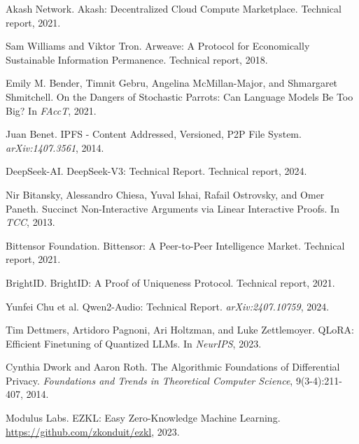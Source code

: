 \documentclass[11pt,a4paper]{article}
\begin{document}

\begin{thebibliography}{99}

Akash Network.
\newblock Akash: Decentralized Cloud Compute Marketplace.
\newblock Technical report, 2021.

Sam Williams and Viktor Tron.
\newblock Arweave: A Protocol for Economically Sustainable Information Permanence.
\newblock Technical report, 2018.

Emily M. Bender, Timnit Gebru, Angelina McMillan-Major, and Shmargaret Shmitchell.
\newblock On the Dangers of Stochastic Parrots: Can Language Models Be Too Big?
\newblock In \textit{FAccT}, 2021.

Juan Benet.
\newblock IPFS - Content Addressed, Versioned, P2P File System.
\newblock \textit{arXiv:1407.3561}, 2014.

DeepSeek-AI.
\newblock DeepSeek-V3: Technical Report.
\newblock Technical report, 2024.

Nir Bitansky, Alessandro Chiesa, Yuval Ishai, Rafail Ostrovsky, and Omer Paneth.
\newblock Succinct Non-Interactive Arguments via Linear Interactive Proofs.
\newblock In \textit{TCC}, 2013.

Bittensor Foundation.
\newblock Bittensor: A Peer-to-Peer Intelligence Market.
\newblock Technical report, 2021.

BrightID.
\newblock BrightID: A Proof of Uniqueness Protocol.
\newblock Technical report, 2021.

Yunfei Chu et al.
\newblock Qwen2-Audio: Technical Report.
\newblock \textit{arXiv:2407.10759}, 2024.

Tim Dettmers, Artidoro Pagnoni, Ari Holtzman, and Luke Zettlemoyer.
\newblock QLoRA: Efficient Finetuning of Quantized LLMs.
\newblock In \textit{NeurIPS}, 2023.

Cynthia Dwork and Aaron Roth.
\newblock The Algorithmic Foundations of Differential Privacy.
\newblock \textit{Foundations and Trends in Theoretical Computer Science}, 9(3-4):211-407, 2014.

Modulus Labs.
\newblock EZKL: Easy Zero-Knowledge Machine Learning.
\newblock \url{https://github.com/zkonduit/ezkl}, 2023.


\end{thebibliography}
\end{document}
